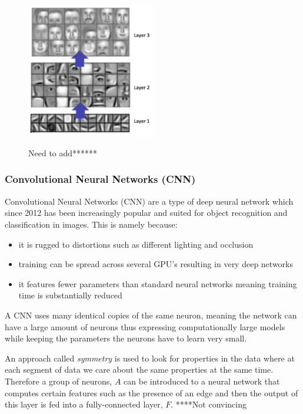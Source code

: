 \documentclass{mproj}
\begin{document}
\begin{figure}[h]
  \caption{Need to add******}
  \centering
  \includegraphics[width=0.5\textwidth]{images/layers.png}
  \label{fig:Deep Net Layers diagram}
\end{figure}


\subsubsection{Convolutional Neural Networks (CNN)}
  
Convolutional Neural Networks (CNN) are a type of deep neural network which since 2012\cite{} has been  increasingly popular and suited for object recognition and classification in images. This is namely because:

\begin{itemize}
\item it is rugged to distortions such as different lighting and  occlusion
\item training can be spread across several GPU's resulting in very deep networks
\item it features fewer parameters than standard neural networks meaning training time is substantially reduced
\end{itemize}

A CNN uses many identical copies of the same neuron, meaning the network can have a large amount of neurons thus expressing computationally large models while keeping the parameters the neurons have to learn very small. \cite{NIPS2012_4824}
  
An approach called \textit{symmetry} is used to look for properties in the data where at each segment of data we care about the same properties at the same time. Therefore a group of neurons, $A$ can be introduced to a neural network that computes certain features such as the presence of an edge and then the output of this layer is fed into a fully-connected layer, $F$. ****Not convincing
  
\end{document}
